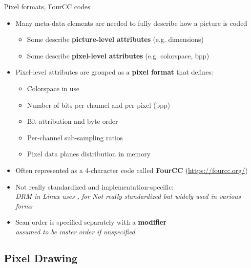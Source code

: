 \begin{frame}[fragile]{Pixel formats, FourCC codes}
  \begin{itemize}
  \item Many meta-data elements are needed to fully describe how a picture is coded
    \begin{itemize}
    \item Some describe \textbf{picture-level attributes} (e.g. dimensions)
    \item Some describe \textbf{pixel-level attributes} (e.g. colorspace, bpp)
    \end{itemize}
  \item Pixel-level attributes are grouped as a \textbf{pixel format} that defines:
    \begin{itemize}
    \item Colorspace in use
    \item Number of bits per channel and per pixel (bpp)
    \item Bit attribution and byte order
    \item Per-channel sub-sampling ratios
    \item Pixel data planes distribution in memory
    \end{itemize}
  \item Often represented as a 4-character code called \textbf{FourCC} {\small(\url{https://fourcc.org/})}\\
  \item Not really standardized and implementation-specific:\\
    \textit{DRM in Linux uses , for }
  \textit{Not really standardized but widely used in various forms}
  \item Scan order is specified separately with a \textbf{modifier}\\
    \textit{assumed to be raster order if unspecified}
  \end{itemize}
\end{frame}

\subsection{Pixel Drawing}

